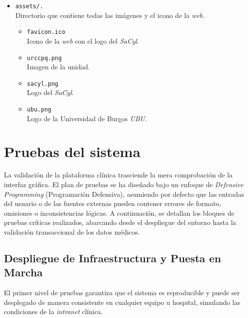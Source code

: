 \begin{itemize}
	\item \texttt{assets/.}\\Directorio que contiene todas las imágenes y el icono de la \textit{web}.
		\begin{itemize}
			\item \texttt{favicon.ico}\\Icono de la \textit{web} con el logo del \textit{SaCyl}.
			\item \texttt{urccpq.png}\\Imagen de la unidad.
			\item \texttt{sacyl.png}\\Logo del \textit{SaCyl}.
			\item \texttt{ubu.png}\\Logo de la Universidad de Burgos \textit{UBU}.
		\end{itemize}
\end{itemize}

\section{Pruebas del sistema} \label{sec:Practica}
La validación de la plataforma clínica trasciende la mera comprobación de la interfaz gráfica. El plan de pruebas se ha diseñado bajo un enfoque de \textit{Defensive Programming} (Programación Defensiva), asumiendo por defecto que las entradas del usuario o de las fuentes externas pueden contener errores de formato, omisiones o inconsistencias lógicas. A continuación, se detallan los bloques de pruebas críticas realizados, abarcando desde el despliegue del entorno hasta la validación transaccional de los datos médicos.

\subsection{Despliegue de Infraestructura y Puesta en Marcha}
El primer nivel de pruebas garantiza que el sistema es reproducible y puede ser desplegado de manera consistente en cualquier equipo u hospital, simulando las condiciones de la \textit{intranet} clínica.

